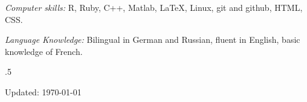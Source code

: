 \documentclass[margin]{res} %
\begin{document}
\begin{resume}
{\sl Computer skills:}
R, Ruby, C++, Matlab, \LaTeX, Linux, git and github, HTML, CSS.

{\sl Language Knowledge:}
Bilingual in German and Russian, fluent in English, basic knowledge of French.

\vfill
\moveleft.5\hoffset\centerline{Updated: \today} 

%
%


\end{resume}
\end{document}
